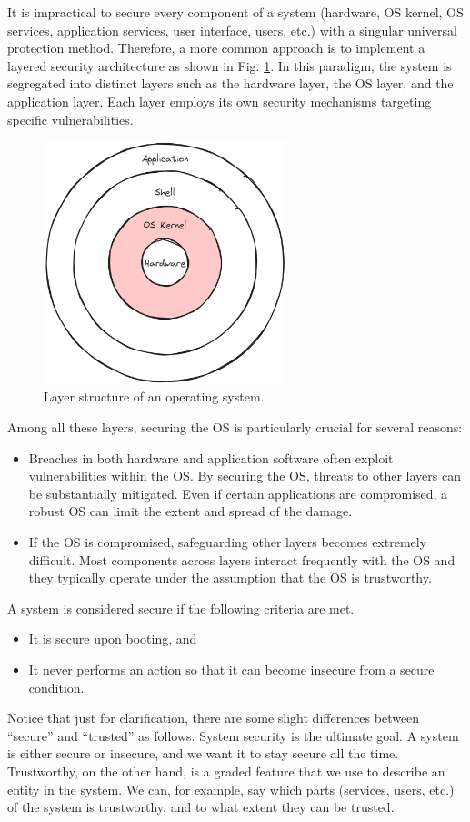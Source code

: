 It is impractical to secure every component of a system (hardware, OS kernel, OS services, application services, user interface, users, etc.) with a singular universal protection method. Therefore, a more common approach is to implement a layered security architecture as shown in Fig. \ref{ch:ossec:fig:layerstructure}. In this paradigm, the system is segregated into distinct layers such as the hardware layer, the OS layer, and the application layer. Each layer employs its own security mechanisms targeting specific vulnerabilities.
\begin{figure}[htbp]
	\centering
	\includegraphics[width=200pt]{chapters/part-4/figures/os_layer.png}
	\caption{Layer structure of an operating system.} \label{ch:ossec:fig:layerstructure}
\end{figure}

Among all these layers, securing the OS is particularly crucial for several reasons:
\begin{itemize}
	\item Breaches in both hardware and application software often exploit vulnerabilities within the OS. By securing the OS, threats to other layers can be substantially mitigated. Even if certain applications are compromised, a robust OS can limit the extent and spread of the damage.
	\item If the OS is compromised, safeguarding other layers becomes extremely difficult. Most components across layers interact frequently with the OS and they typically operate under the assumption that the OS is trustworthy.
\end{itemize}

A system is considered secure if the following criteria are met.
\begin{itemize}
	\item It is secure upon booting, and
	\item It never performs an action so that it can become insecure from a secure condition.
\end{itemize}
Notice that just for clarification, there are some slight differences between ``secure'' and ``trusted'' as follows. System security is the ultimate goal. A system is either secure or insecure, and we want it to stay secure all the time. Trustworthy, on the other hand, is a graded feature that we use to describe an entity in the system. We can, for example, say which parts (services, users, etc.) of the system is trustworthy, and to what extent they can be trusted.

